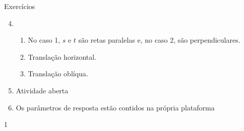 \begin{answer}{Exercícios}
{\exerciselist
\begin{enumerate}\setcounter{enumi}{3}
\item 
\begin{enumerate}
\item No caso 1, $s$ e $t$ são retas paralelas e, no caso 2, são perpendiculares.
\item Translação horizontal.
\item Translação oblíqua.
\end{enumerate}

\item Atividade aberta

\item Os parâmetros de resposta estão contidos na própria plataforma
\end{enumerate}
}{1}
\end{answer}

\exercise

